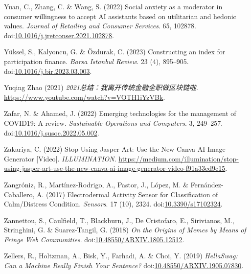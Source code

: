 \documentclass[
  letterpaper,
  DIV=11,
  numbers=noendperiod]{scrartcl}
\newlength{\cslhangindent}
\newenvironment{CSLReferences}[2] %
 {\begin{list}{}{%
  \setlength{\itemindent}{0pt}
  \setlength{\leftmargin}{0pt}
  \setlength{\parsep}{0pt}
  \ifodd #1
   \setlength{\leftmargin}{\cslhangindent}
   \setlength{\itemindent}{-1\cslhangindent}
  \fi
  \setlength{\itemsep}{#2\baselineskip}}}
 {\end{list}}
\begin{document}
\begin{CSLReferences}{0}{1}
Yuan, C., Zhang, C. \& Wang, S. (2022) Social anxiety as a moderator in
consumer willingness to accept {AI} assistants based on utilitarian and
hedonic values. \emph{Journal of Retailing and Consumer Services}. 65,
102878.
doi:\href{https://doi.org/10.1016/j.jretconser.2021.102878}{10.1016/j.jretconser.2021.102878}.

Yüksel, S., Kalyoncu, G. \& Özdurak, C. (2023) Constructing an index for
participation finance. \emph{Borsa Istanbul Review}. 23 (4), 895--905.
doi:\href{https://doi.org/10.1016/j.bir.2023.03.003}{10.1016/j.bir.2023.03.003}.

Yuqing Zhao (2021) \emph{2021总结：我离开传统金融全职做区块链啦}.
\url{https://www.youtube.com/watch?v=VOTH1iYzVBk}.

Zafar, N. \& Ahamed, J. (2022) Emerging technologies for the management
of {COVID19}: {A} review. \emph{Sustainable Operations and Computers}.
3, 249--257.
doi:\href{https://doi.org/10.1016/j.susoc.2022.05.002}{10.1016/j.susoc.2022.05.002}.

Zakariya, C. (2022) Stop {Using Jasper Art}: {Use} the {New Canva AI
Image Generator} {[}{Video}{]}. \emph{ILLUMINATION}.
\url{https://medium.com/illumination/stop-using-jasper-art-use-the-new-canva-ai-image-generator-video-f91a33ed9c15}.

Zangróniz, R., Martínez-Rodrigo, A., Pastor, J., López, M. \&
Fernández-Caballero, A. (2017) Electrodermal {Activity Sensor} for
{Classification} of {Calm}/{Distress Condition}. \emph{Sensors}. 17
(10), 2324.
doi:\href{https://doi.org/10.3390/s17102324}{10.3390/s17102324}.

Zannettou, S., Caulfield, T., Blackburn, J., De Cristofaro, E.,
Sirivianos, M., Stringhini, G. \& Suarez-Tangil, G. (2018) \emph{On the
{Origins} of {Memes} by {Means} of {Fringe Web Communities}}.
doi:\href{https://doi.org/10.48550/ARXIV.1805.12512}{10.48550/ARXIV.1805.12512}.

Zellers, R., Holtzman, A., Bisk, Y., Farhadi, A. \& Choi, Y. (2019)
\emph{{HellaSwag}: {Can} a {Machine Really Finish Your Sentence}?}
doi:\href{https://doi.org/10.48550/ARXIV.1905.07830}{10.48550/ARXIV.1905.07830}.


\end{CSLReferences}
\end{document}
